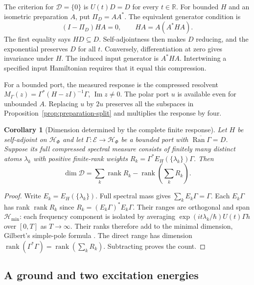 \documentclass[11pt]{article}
\newtheorem{corollary}[proposition]{Corollary}
\theoremstyle{definition}
\DeclareMathOperator{\Ran}{Ran}
\DeclareMathOperator{\rank}{rank}
\newcommand{\R}{\mathbb R}
\newcommand{\Hmin}{\mathcal H_{\min}}
\begin{document}
The criterion for $\mathcal D=\{0\}$ is $U(t)D=D$ for every $t\in\R$. For bounded $H$ and an isometric preparation $A$, put $\Pi_D=AA^*$. The equivalent generator condition is
\begin{equation}
 (I-\Pi_D)HA=0,\qquad HA=A(A^*HA).
 \label{eq:finite-preparation-invariance}
\end{equation}
The first equality says $HD\subseteq D$. Self-adjointness then makes $D$ reducing, and the exponential preserves $D$ for all $t$. Conversely, differentiation at zero gives invariance under $H$. The induced input generator is $A^*HA$. Intertwining a specified input Hamiltonian requires that it equal this compression.

For a bounded port, the measured response is the compressed resolvent $M_\Gamma(z)=\Gamma^*(H-zI)^{-1}\Gamma$, $\operatorname{Im}z\ne0$. The polar port $u$ is available even for unbounded $A$. Replacing $u$ by $2u$ preserves all the subspaces in Proposition~\ref{prop:preparation-split} and multiplies the response by four.

\begin{corollary}[Dimension determined by the complete finite response]\label{cor:finite-response-defect}
Let $H$ be self-adjoint on $\mathcal H_\Phi$ and let $\Gamma:\mathcal E\to\mathcal H_\Phi$ be a bounded port with $\overline{\Ran\Gamma}=D$. Suppose its full compressed spectral measure consists of finitely many distinct atoms $\lambda_k$ with positive finite-rank weights $R_k=\Gamma^*E_H(\{\lambda_k\})\Gamma$. Then
\[
 \dim\mathcal D=\sum_k\rank R_k-\rank\!\left(\sum_kR_k\right).
\]
\end{corollary}
\begin{proof}
Write $E_k=E_H(\{\lambda_k\})$. Full spectral mass gives $\sum_k E_k\Gamma=\Gamma$. Each $E_k\Gamma$ has rank $\rank R_k$ since $R_k=(E_k\Gamma)^*E_k\Gamma$. Their ranges are orthogonal and span $\Hmin$: each frequency component is isolated by averaging $\exp(it\lambda_k/\hbar)U(t)\Gamma h$ over $[0,T]$ as $T\to\infty$. Their ranks therefore add to the minimal dimension, Gilbert's simple-pole formula \cite[Thm.~7]{Gilbert1963}. The direct range has dimension $\rank(\Gamma^*\Gamma)=\rank(\sum_kR_k)$. Subtracting proves the count.
\end{proof}

\subsection{A ground and two excitation energies}
\label{subsec:pair-grounds-excitations}
\end{document}
